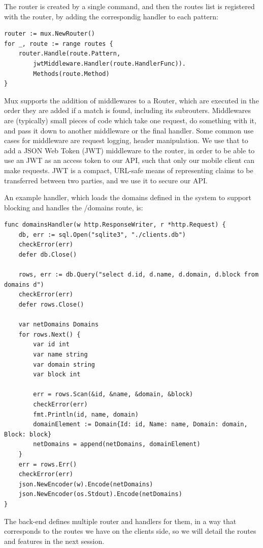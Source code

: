 The router is created by a single command, and then the routes list is registered with the router, by adding the correspondig handler to each pattern:

\begin{lstlisting}[language=Golang]
router := mux.NewRouter()
for _, route := range routes {
	router.Handle(route.Pattern, 
		jwtMiddleware.Handler(route.HandlerFunc)).
		Methods(route.Method)
}
\end{lstlisting}

Mux supports the addition of middlewares to a Router, which are executed in the order they are added if a match is found, including its subrouters. Middlewares are (typically) small pieces of code which take one request, do something with it, and pass it down to another middleware or the final handler. Some common use cases for middleware are request logging, header manipulation. We use that to add a JSON Web Token (JWT) \citep{rfcJWT} middleware to the router, in order to be able to use an JWT as an access token to our API, such that only our mobile client can make requests. JWT is a compact, URL-safe means of representing claims to be transferred between two parties, and we use it to secure our API.

An example handler, which loads the domains defined in the system to support blocking and handles the /domains route, is:

\begin{lstlisting}[language=Golang]
func domainsHandler(w http.ResponseWriter, r *http.Request) {
	db, err := sql.Open("sqlite3", "./clients.db")
	checkError(err)
	defer db.Close()

	rows, err := db.Query("select d.id, d.name, d.domain, d.block from domains d")
	checkError(err)
	defer rows.Close()

	var netDomains Domains
	for rows.Next() {
		var id int
		var name string
		var domain string
		var block int

		err = rows.Scan(&id, &name, &domain, &block)
		checkError(err)
		fmt.Println(id, name, domain)
		domainElement := Domain{Id: id, Name: name, Domain: domain, Block: block}
		netDomains = append(netDomains, domainElement)
	}
	err = rows.Err()
	checkError(err)
	json.NewEncoder(w).Encode(netDomains)
	json.NewEncoder(os.Stdout).Encode(netDomains)
}
\end{lstlisting}

The back-end defines multiple router and handlers for them, in a way that corresponds to the routes we have on the clients side, so we will detail the routes and features in the next session.

